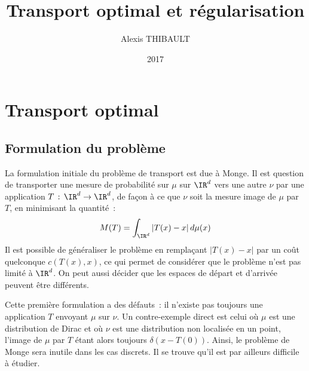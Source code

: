 
\usepackage{subcaption}

\DeclareMathOperator{\diag}{\mathbf{diag}}
\DeclareMathOperator{\Ccal}{\mathcal{C}}

\title{Transport optimal et régularisation}
\author{Alexis THIBAULT}
\date{2017}



\maketitle

\tableofcontents

\section{Transport optimal}

\subsection{Formulation du problème}
La formulation initiale du problème de transport est due à Monge. Il est question de transporter une mesure de probabilité sur $\mu$ sur $\IR^d$ vers une autre $\nu$ par une application $T\,:\,\IR^d \rightarrow \IR^d$, de façon à ce que $\nu$ soit la mesure image de $\mu$ par $T$, en minimisant la quantité~:
\begin{equation}
\label{eq:monge}
M(T) = \int_{\IR^d} |T(x)-x|\,d\mu(x)
\end{equation}
Il est possible de généraliser le problème en remplaçant $|T(x)-x|$ par un coût quelconque $c(T(x),x)$, ce qui permet de considérer que le problème n'est pas limité à $\IR^d$. On peut aussi décider que les espaces de départ et d'arrivée peuvent être différents.

Cette première formulation a des défauts~: il n'existe pas toujours une application $T$ envoyant $\mu$ sur $\nu$. Un contre-exemple direct est celui où $\mu$ est une distribution de Dirac et où $\nu$ est une distribution non localisée en un point, l'image de $\mu$ par $T$ étant alors toujours $\delta(x-T(0))$. Ainsi, le problème de Monge sera inutile dans les cas discrets. Il se trouve qu'il est par ailleurs difficile à étudier.

